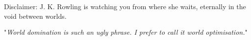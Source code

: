 Disclaimer: J. K. Rowling is watching you from where she waits, eternally in the void between worlds.

"\emph{World domination is such an ugly phrase. I prefer to call it world optimisation.}"

